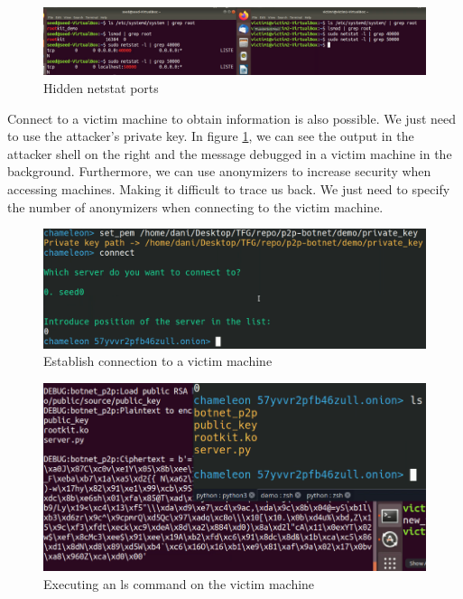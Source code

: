 \documentclass[11pt, a4paper,twoside]{tesi_upf}
\begin{document}
\begin{figure}[H]
\centering
\includegraphics[width=\linewidth]{images/hide-lkm-netstat.png}
    \caption{Hidden netstat ports}
\end{figure}

Connect to a victim machine to obtain information is also possible. We just need to use the attacker's private key. In figure \ref{fig:victim-command}, we can see the output in the attacker shell on the right and the message debugged in a victim machine in the background. Furthermore, we can use anonymizers to increase security when accessing machines. Making it difficult to trace us back. We just need to specify the number of anonymizers when connecting to the victim machine.
\\
\begin{figure}[H]
\centering
\includegraphics[width=\linewidth]{images/connect-to-victim.png}
    \caption{Establish connection to a victim machine}
\end{figure}
\begin{figure}[H]
\centering
\includegraphics[width=\linewidth]{images/ls-victim.png}
    \caption{Executing an ls command on the victim machine}
    \label{fig:victim-command}
\end{figure}
\end{document}
